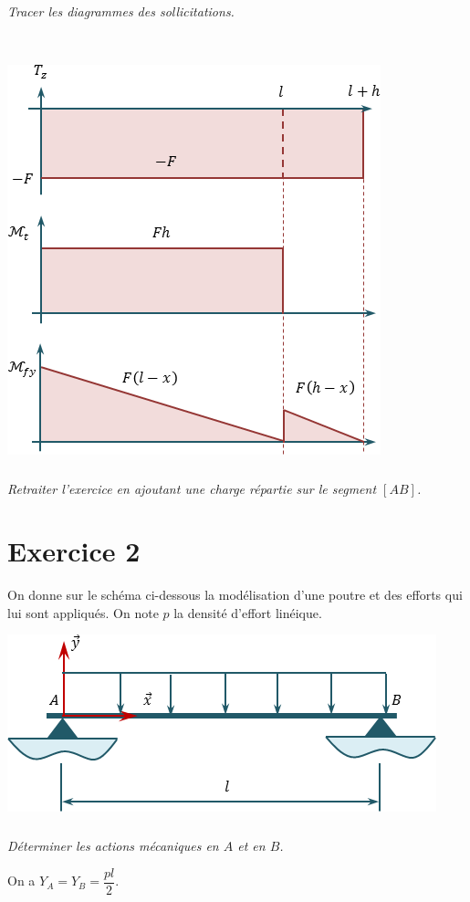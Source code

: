 \documentclass[10pt,fleqn]{article} %
\begin{document}
\begin{multicols}{2}
\subparagraph{}
\textit{Tracer les diagrammes des sollicitations.}
\ifprof
\begin{corrige}~\\
\begin{center}
\includegraphics[width=.4\linewidth]{images/exo_02_corr_03}
\end{center}

\end{corrige}
\else 
\fi



\subparagraph{}
\textit{Retraiter l'exercice en ajoutant une charge répartie sur le segment $[AB]$.}
\ifprof
\begin{corrige}
\end{corrige}

\else 
\fi



\newpage




\section*{Exercice 2}
\setcounter{subparagraph}{0}
On donne sur le schéma ci-dessous la modélisation d'une poutre et des efforts qui lui sont appliqués. On note $p$ la densité d'effort linéique.
\begin{center}
\includegraphics[width=.45\textwidth]{images/exo_05}
\end{center}

\subparagraph{}
\textit{Déterminer les actions mécaniques en $A$ et en $B$.}
\ifprof
\begin{corrige}
On a $Y_A = Y_B = \dfrac{pl}{2}$.
\end{corrige}
\else 
\fi



\end{multicols}
\end{document}
